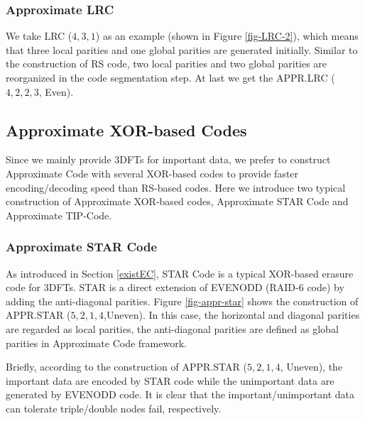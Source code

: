 \documentclass[sigconf]{acmart}
\begin{document}
\subsubsection{Approximate LRC}

We take LRC ($4, 3, 1$) \cite{LRC} as an example (shown in Figure \ref{fig-LRC-2}), which means that three local parities and one global parities are generated initially. Similar to the construction of RS code, two local parities and two global parities are reorganized in the code segmentation step. At last we get the APPR.LRC ($4, 2, 2, 3$, Even).

\subsection{Approximate XOR-based Codes}\label{APPRXOR}
Since we mainly provide 3DFTs for important data, we prefer to construct Approximate Code with several XOR-based codes to provide faster encoding/decoding speed than RS-based codes. Here we introduce two typical construction of Approximate XOR-based codes, Approximate STAR Code and Approximate TIP-Code.

\subsubsection{Approximate STAR Code}

As introduced in Section \ref{existEC}, STAR Code \cite{STAR} is a typical XOR-based erasure code for 3DFTs. STAR is a direct extension of EVENODD\cite{EVENODD} (RAID-6 code) by adding the anti-diagonal parities. Figure \ref{fig-appr-star} shows the construction of APPR.STAR ($5,2,1,4$,Uneven). In this case, the horizontal and diagonal parities are regarded as local parities,  the anti-diagonal parities are defined as global parities in Approximate Code framework.

Briefly, according to the construction of APPR.STAR ($5,2,1,4$, Uneven), the important data are encoded by STAR code while the unimportant data are generated by EVENODD code. It is clear that the important/unimportant data can tolerate triple/double nodes fail, respectively.
\end{document}

